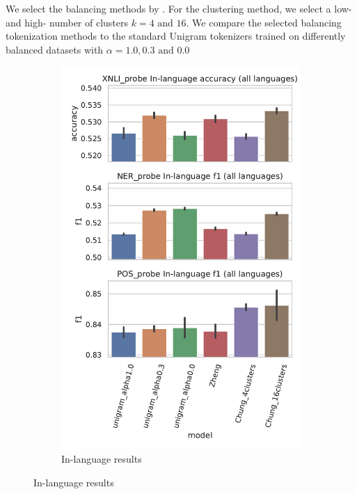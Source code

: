 We select the balancing methods by \citet{chung_improving_2020,zheng_allocating_2021}. For the clustering method, we select a low- and high- number of clusters $k=4\text{ and }16$. We compare the selected balancing tokenization methods to the standard Unigram tokenizers trained on differently balanced datasets with $\alpha=1.0, 0.3\text{ and }0.0$

\begin{figure}
    \centering
    \begin{subfigure}{.5\textwidth}
      \centering
      \includegraphics[width=\linewidth]{figures/probe_overall_inlanguage.pdf}
      \caption{In-language results}
      \label{fig:probe_overall_inlanguage}

\end{subfigure}
\end{figure}
